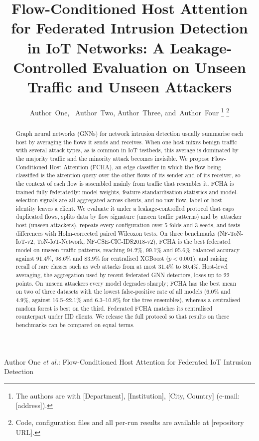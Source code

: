 \documentclass[journal]{IEEEtran}
\begin{document}
\title{Flow-Conditioned Host Attention for Federated Intrusion Detection in IoT Networks: A Leakage-Controlled Evaluation on Unseen Traffic and Unseen Attackers}

\author{Author~One,~
        Author~Two,
        Author~Three,
        and~Author~Four%
\thanks{The authors are with [Department], [Institution], [City, Country] (e-mail: [address]).}%
\thanks{Code, configuration files and all per-run results are available at [repository URL].}}

%
{Author One \MakeLowercase{\textit{et al.}}: Flow-Conditioned Host Attention for Federated IoT Intrusion Detection}

\maketitle

\begin{abstract}
Graph neural networks (GNNs) for network intrusion detection usually summarise each host by averaging the flows it sends and receives. When one host mixes benign traffic with several attack types, as is common in IoT testbeds, this average is dominated by the majority traffic and the minority attack becomes invisible. We propose Flow-Conditioned Host Attention (FCHA), an edge classifier in which the flow being classified is the attention query over the other flows of its sender and of its receiver, so the context of each flow is assembled mainly from traffic that resembles it. FCHA is trained fully federatedly: model weights, feature standardisation statistics and model-selection signals are all aggregated across clients, and no raw flow, label or host identity leaves a client. We evaluate it under a leakage-controlled protocol that caps duplicated flows, splits data by flow signature (unseen traffic patterns) and by attacker host (unseen attackers), repeats every configuration over 5 folds and 3 seeds, and tests differences with Holm-corrected paired Wilcoxon tests. On three benchmarks (NF-ToN-IoT-v2, ToN-IoT-Network, NF-CSE-CIC-IDS2018-v2), FCHA is the best federated model on unseen traffic patterns, reaching 94.2\%, 99.1\% and 95.6\% balanced accuracy against 91.4\%, 98.6\% and 83.9\% for centralised XGBoost ($p<0.001$), and raising recall of rare classes such as web attacks from at most 31.4\% to 80.4\%. Host-level averaging, the aggregation used by recent federated GNN detectors, loses up to 22 points. On unseen attackers every model degrades sharply; FCHA has the best mean on two of three datasets with the lowest false-positive rate of all models (6.0\% and 4.9\%, against 16.5--22.1\% and 6.3--10.8\% for the tree ensembles), whereas a centralised random forest is best on the third. Federated FCHA matches its centralised counterpart under IID clients. We release the full protocol so that results on these benchmarks can be compared on equal terms.
\end{abstract}
\end{document}

